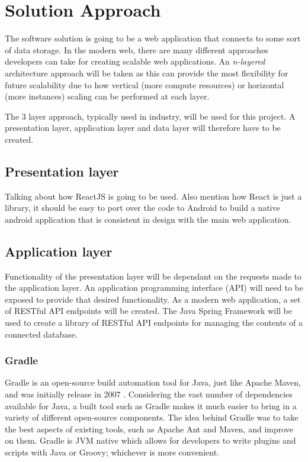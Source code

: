 \section{Solution Approach}
The software solution is going to be a web application that connects to some sort of data storage.
In the modern web, there are many different approaches developers can take for creating scalable web applications.
An \textit{n-layered} architecture approach will be taken as this can provide the most flexibility for future scalability 
due to how vertical (more compute resources) or horizontal (more instances) scaling can be performed at each layer.

The 3 layer approach, typically used in industry, will be used for this project.
A presentation layer, application layer and data layer will therefore have to be created.

\subsection{Presentation layer}
Talking about how ReactJS is going to be used.
Also mention how React is just a library, it should be easy to port over the code to Android to build a native
android application that is consistent in design with the main web application.


\subsection{Application layer}
Functionality of the presentation layer will be dependant on the requests made to the application layer.
An application programming interface (API) will need to be exposed to provide that desired functionality.
As a modern web application, a set of RESTful API endpoints will be created.
The Java Spring Framework will be used to create a library of RESTful API endpoints for managing the contents of a connected database.


\subsubsection{Gradle}
Gradle is an open-source build automation tool for Java, just like Apache Maven, and was initially release in 2007 \cite{muschko2014gradle}.
Considering the vast number of dependencies available for Java, a built tool such as Gradle makes it much easier to bring in
a variety of different open-source components.
The idea behind Gradle was to take the best aspects of existing tools, such as Apache Ant and Maven, and improve on them.
Gradle is JVM native which allows for developers to write plugins and scripts with Java or Groovy; whichever is more convenient. 

